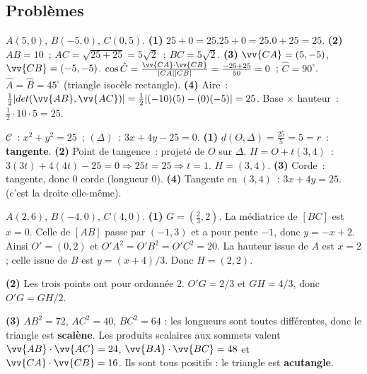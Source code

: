 \subsection*{Probl\`emes}


$A(5,0)$, $B(-5,0)$, $C(0,5)$.
\textbf{(1)} $25+0=25$.\checkmark\quad $25+0=25$.\checkmark\quad $0+25=25$.\checkmark
\textbf{(2)} $AB=10$~; $AC=\sqrt{25+25}=5\sqrt{2}$~; $BC=5\sqrt{2}$.
\textbf{(3)} $\vv{CA}=(5,-5)$, $\vv{CB}=(-5,-5)$.
$\cos\hat{C}=\frac{\vv{CA}\cdot\vv{CB}}{|CA||CB|}=\frac{-25+25}{50}=0$~; $\hat{C}=90^{\circ}$.
$\hat{A}=\hat{B}=45^{\circ}$ (triangle isoc\`ele rectangle).
\textbf{(4)} Aire~: $\frac{1}{2}|det(\vv{AB},\vv{AC})|=\frac{1}{2}|(-10)(5)-(0)(-5)|=25$.
Base $\times$ hauteur~: $\frac{1}{2}\cdot10\cdot5=25$.\checkmark


$\mathcal{C}$~: $x^2+y^2=25$~; $(\Delta)$~: $3x+4y-25=0$.
\textbf{(1)} $d(O,\Delta)=\frac{25}{5}=5=r$~: \textbf{tangente}.
\textbf{(2)} Point de tangence~: projet\'e de $O$ sur $\Delta$.
$H=O+t(3,4)$~: $3(3t)+4(4t)-25=0\Rightarrow25t=25\Rightarrow t=1$.
$H=(3,4)$.
\textbf{(3)} Corde~: tangente, donc 0 corde (longueur 0).
\textbf{(4)} Tangente en $(3,4)$~: $3x+4y=25$.\checkmark (c'est la droite elle-m\^eme).


$A(2,6)$, $B(-4,0)$, $C(4,0)$.
\textbf{(1)} $G=(\frac23,2)$.
La m\'ediatrice de $[BC]$ est $x=0$. Celle de $[AB]$ passe par $(-1,3)$
et a pour pente $-1$, donc $y=-x+2$. Ainsi $O'=(0,2)$ et
$O'A^2=O'B^2=O'C^2=20$.
La hauteur issue de $A$ est $x=2$; celle issue de $B$ est
$y=(x+4)/3$. Donc $H=(2,2)$.

\textbf{(2)} Les trois points ont pour ordonn\'ee $2$.
$O'G=2/3$ et $GH=4/3$, donc $O'G=GH/2$.

\textbf{(3)} $AB^2=72$, $AC^2=40$, $BC^2=64$ : les longueurs sont
 toutes diff\'erentes, donc le triangle est \textbf{scal\`ene}.
Les produits scalaires aux sommets valent
$\vv{AB}\cdot\vv{AC}=24$, $\vv{BA}\cdot\vv{BC}=48$ et
$\vv{CA}\cdot\vv{CB}=16$. Ils sont tous positifs : le triangle est \textbf{acutangle}.

